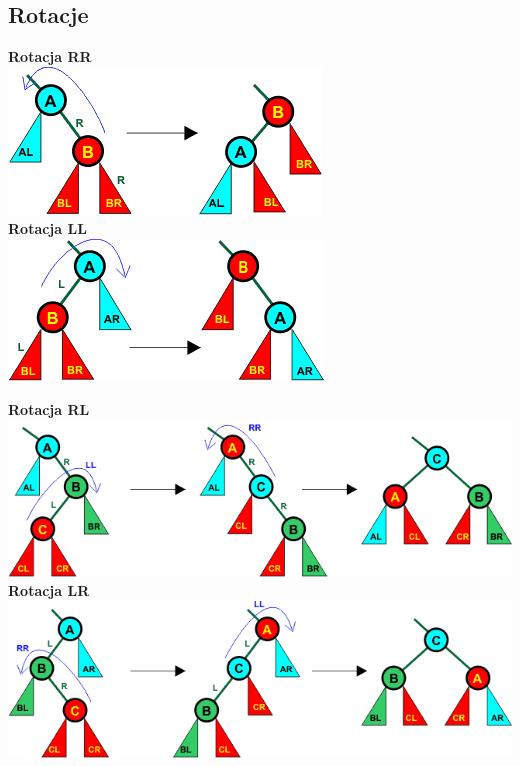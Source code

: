 \documentclass[12pt]{article}
\begin{document}
    \subsection{Rotacje}
    \begin{multicols}{2}
    \textbf{Rotacja RR} \\
    
    \includegraphics[width=0.8\linewidth]{avl-trees/rr-rotation.png}
    \columnbreak \\
    \textbf{Rotacja LL} \\
    
    \includegraphics[width=0.8\linewidth]{avl-trees/ll-rotation.png}
    \end{multicols}
    
    \textbf{Rotacja RL} \\
    
    \includegraphics[width=\linewidth]{avl-trees/rl-rotation.png} \\

    \textbf{Rotacja LR} \\
    
    \includegraphics[width=\linewidth]{avl-trees/lr-rotation.png} \\
    
\end{document}
